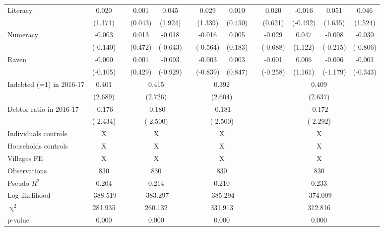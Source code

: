\begin{table}[htbp]
{\begin{tabular}{lcccccccccccc}
    Literacy & 0.020 &   & 0.001 & \cellcolor[rgb]{ 1,  1,  0}0.045 &   & 0.029 & 0.010 &   & 0.020 & -0.016 & 0.051 & 0.046 \\
      & (1.171) &   & (0.043) & (1.924) &   & (1.339) & (0.450) &   & (0.621) & (-0.492) & (1.635) & (1.524) \\
    Numeracy & -0.003 &   & 0.013 & -0.018 &   & -0.016 & 0.005 &   & -0.029 & 0.047 & -0.008 & -0.030 \\
      & (-0.140) &   & (0.472) & (-0.643) &   & (-0.564) & (0.183) &   & (-0.688) & (1.122) & (-0.215) & (-0.806) \\
    Raven & -0.000 &   & 0.001 & -0.003 &   & -0.003 & 0.003 &   & -0.001 & 0.006 & -0.006 & -0.001 \\
      & (-0.105) &   & (0.429) & (-0.929) &   & (-0.839) & (0.847) &   & (-0.258) & (1.161) & (-1.179) & (-0.343) \\

\cmidrule{1-2}\cmidrule{4-5}\cmidrule{7-8}\cmidrule{10-13}    Indebted (=1) in 2016-17 & 0.401 &       & \multicolumn{2}{c}{0.415} &       & \multicolumn{2}{c}{0.392} &       & \multicolumn{4}{c}{0.409} \\
          & (2.689) &       & \multicolumn{2}{c}{(2.726)} &       & \multicolumn{2}{c}{(2.604)} &       & \multicolumn{4}{c}{(2.637)} \\
    Debtor ratio in 2016-17 & -0.176 &       & \multicolumn{2}{c}{-0.180} &       & \multicolumn{2}{c}{-0.181} &       & \multicolumn{4}{c}{-0.172} \\
          & (-2.434) &       & \multicolumn{2}{c}{(-2.500)} &       & \multicolumn{2}{c}{(-2.500)} &       & \multicolumn{4}{c}{(-2.292)} \\
    Individuals controls & X     &       & \multicolumn{2}{c}{X} &       & \multicolumn{2}{c}{X} &       & \multicolumn{4}{c}{X} \\
    Households controls & X     &       & \multicolumn{2}{c}{X} &       & \multicolumn{2}{c}{X} &       & \multicolumn{4}{c}{X} \\
    Villages FE & X     &       & \multicolumn{2}{c}{X} &       & \multicolumn{2}{c}{X} &       & \multicolumn{4}{c}{X} \\
    \midrule
    Observations & 830   &       & \multicolumn{2}{c}{830} &       & \multicolumn{2}{c}{830} &       & \multicolumn{4}{c}{830} \\
    Pseudo $R^2$ & 0.204 &       & \multicolumn{2}{c}{0.214} &       & \multicolumn{2}{c}{0.210} &       & \multicolumn{4}{c}{0.233} \\
    Log-likelihood & -388.519 &       & \multicolumn{2}{c}{-383.297} &       & \multicolumn{2}{c}{-385.294} &       & \multicolumn{4}{c}{-374.009} \\
    $\upchi^2$ & 281.935 &       & \multicolumn{2}{c}{260.132} &       & \multicolumn{2}{c}{331.913} &       & \multicolumn{4}{c}{312.816} \\
    p-value & 0.000 &       & \multicolumn{2}{c}{0.000} &       & \multicolumn{2}{c}{0.000} &       & \multicolumn{4}{c}{0.000} \\
    \bottomrule


\end{tabular}}
\end{table}
